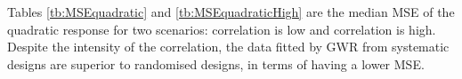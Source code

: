 \documentclass[a4paper]{article} 	%
\newcommand{\Matern}{Mat\'ern }
\newcommand{\zc}[1]{\textcolor{blue}{#1}}
\begin{document}
Tables \ref{tb:MSEquadratic} and \ref{tb:MSEquadraticHigh} are the median MSE of the quadratic response for two scenarios: correlation is low and correlation is high. Despite the intensity of the correlation, the data fitted by GWR from systematic designs are superior to randomised designs, in terms of having a lower MSE. 

\end{document}
